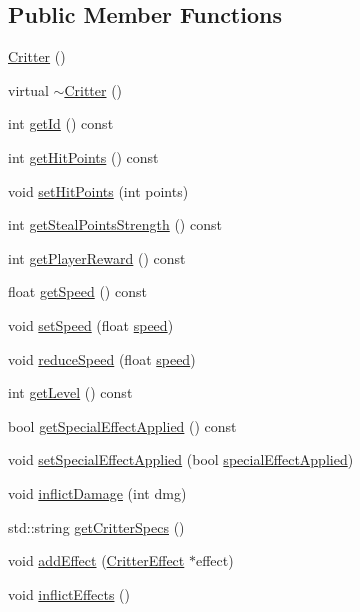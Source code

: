 \subsection*{Public Member Functions}
\begin{DoxyCompactItemize}
\item 
\hyperlink{class_critter_a05aa21e3b570d7380f3ead47c99442ef}{Critter} ()
\item 
virtual \hyperlink{class_critter_a23e65a0917fc76bcf349e2a28fad5c42}{$\sim$\+Critter} ()
\item 
int \hyperlink{class_critter_a5636f0ed2f067318e0d361fe31c9eff2}{get\+Id} () const 
\item 
int \hyperlink{class_critter_a1e98c05f5a41102cc37eb7a4396b90cf}{get\+Hit\+Points} () const 
\item 
void \hyperlink{class_critter_adca76b21049a0bdd0b3e1505996c71ea}{set\+Hit\+Points} (int points)
\item 
int \hyperlink{class_critter_ac57f38074517fa1cc481380aaff1ed85}{get\+Steal\+Points\+Strength} () const 
\item 
int \hyperlink{class_critter_a7db2281b14479a1c931716c07acbc7da}{get\+Player\+Reward} () const 
\item 
float \hyperlink{class_critter_a3785ffa05cec86b30264fbdbf613e4f8}{get\+Speed} () const 
\item 
void \hyperlink{class_critter_a52be1f776c5c8fbcba1efadceaccc759}{set\+Speed} (float \hyperlink{class_critter_adde7d84a0dd9ac8f5dc144464928638f}{speed})
\item 
void \hyperlink{class_critter_ae843395fb1106cd2c550cd9be9f14df0}{reduce\+Speed} (float \hyperlink{class_critter_adde7d84a0dd9ac8f5dc144464928638f}{speed})
\item 
int \hyperlink{class_critter_aebbb372bdcd3a709428445554c3d24c9}{get\+Level} () const 
\item 
bool \hyperlink{class_critter_aaf084b7cd4ffaa632454ee363723db92}{get\+Special\+Effect\+Applied} () const 
\item 
void \hyperlink{class_critter_a662c3e493cd09b78df86afdc3c0725df}{set\+Special\+Effect\+Applied} (bool \hyperlink{class_critter_aa30e57414bd64c920dca286f87da5c3f}{special\+Effect\+Applied})
\item 
void \hyperlink{class_critter_a3601e12d79247c3345e9e828688cf321}{inflict\+Damage} (int dmg)
\item 
std\+::string \hyperlink{class_critter_ae0799b0a4602623632fa382e5ad0d0c8}{get\+Critter\+Specs} ()
\item 
void \hyperlink{class_critter_a50549d8f01246886b931345865ec9949}{add\+Effect} (\hyperlink{class_critter_effect}{Critter\+Effect} $\ast$effect)
\item 
void \hyperlink{class_critter_a06a644a7f12cde7d40679b396c4a3796}{inflict\+Effects} ()
\end{DoxyCompactItemize}
